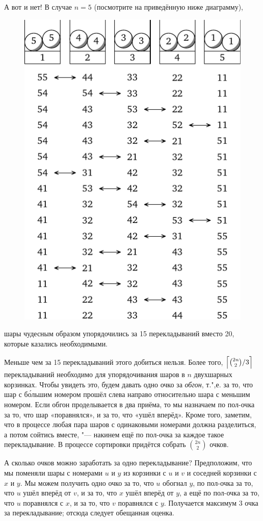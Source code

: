 \documentclass[twoside]{book}
\begin{document}
А вот и нет!
В случае $n = 5$ (посмотрите на приведённую ниже диаграмму),
\begin{figure}[!ht]
\centering
\includegraphics{mp/wink-280}
\end{figure}
шары чудесным образом упорядочились за 15 перекладываний вместо 20, которые казались необходимыми.

Меньше чем за 15 перекладываний этого добиться нельзя.
Более того, $\Bigl\lceil\binom{2n}{2}/3\Bigr\rceil$ перекладываний необходимо для упорядочивания шаров в $n$ двухшарных корзинках.
Чтобы увидеть это, будем давать одно очко за \emph{обгон}, т.",е. за то, что шар с б\'{о}льшим номером прошёл слева направо относительно шара с меньшим номером.
Если обгон проделывается в два приёма, то мы назначаем по пол-очка за то, что шар «поравнялся», и за то, что «ушёл вперёд».
Кроме того, заметим, что в процессе любая пара шаров с одинаковыми номерами должна разделиться, а потом сойтись вместе, "--- накинем ещё по пол-очка за каждое такое перекладывание. 
В процессе сортировки придётся собрать $\binom{2n}2$ очков.

А сколько очков можно заработать за одно перекладывание?
Предположим, что мы поменяли шары с номерами $u$ и $y$ из корзинки с $u$ и $v$ и соседней корзинки с $x$ и $y$.
Мы можем получить одно очко за то, что $u$ обогнал $y$,
по пол-очка за то, что $u$ ушёл вперёд от $v$,
и за то, что $x$ ушёл вперёд от $y$,
а ещё по пол-очка за то, что $u$ поравнялся с $x$, 
и за то, что $v$ поравнялся с $y$.
Получается максимум 3 очка за перекладывание;
отсюда следует обещанная оценка.
\end{document}
